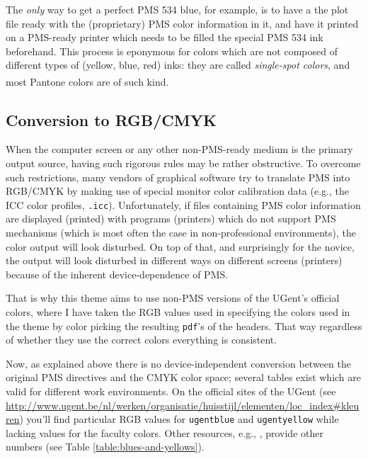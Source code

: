 \documentclass[a4paper,10pt]{article}
\theoremstyle{definition}
\begin{document}
The \emph{only} way to get a perfect PMS 534 blue, for example, is to have a the plot file ready with the (proprietary) PMS color information in it, and have it printed on a PMS-ready printer which needs to be filled the special PMS 534 ink beforehand. This process is eponymous for colors which are not composed of different types of (yellow, blue, red) inks: they are called \emph{single-spot colors}, and most Pantone\textsuperscript{\textregistered} colors are of such kind.


\subsection{Conversion to RGB/CMYK}

When the computer screen or any other non-PMS-ready medium is the primary output source, having such rigorous rules may be rather obstructive. To overcome such restrictions, many vendors of graphical software try to translate PMS into RGB/CMYK by making use of special monitor color calibration data (e.g., the ICC color profiles, \verb!.icc!). Unfortunately, if files containing PMS color information are displayed (printed) with programs (printers) which do not support PMS mechanisms (which is most often the case in non-professional environments), the color output will look disturbed. On top of that, and surprisingly for the novice, the output will look disturbed in different ways on different screens (printers) because of the inherent device-dependence of PMS.

That is why this theme aims to use non-PMS versions of the UGent's official colors, where I have taken the RGB values used in specifying the colors used in the theme by color picking the resulting \verb|pdf|'s of the headers. That way regardless of whether they use the correct colors everything is consistent.

Now, as explained above there is no device-independent conversion between the original PMS directives and the CMYK color space; several tables exist which are valid for different work environments. On the official sites of the UGent (see \url{http://www.ugent.be/nl/werken/organisatie/huisstijl/elementen/loc_index#kleuren}) you'll find particular RGB values for \verb|ugentblue| and \verb|ugentyellow| while lacking values for the faculty colors. Other resources, e.g., \cite{conversion-chart}, provide other numbers (see Table \ref{table:blues-and-yellows}).
\end{document}
